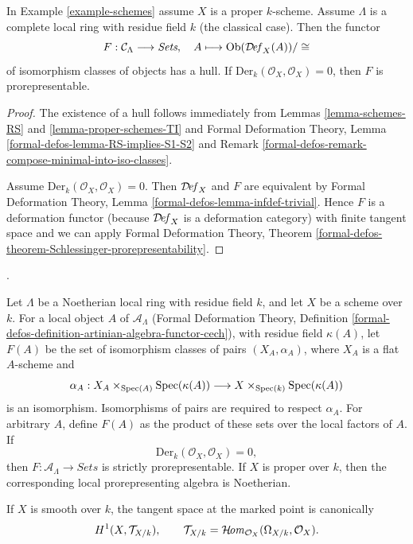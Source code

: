 \begin{lemma}
\label{lemma-schemes-hull}
In Example \ref{example-schemes} assume $X$ is a proper $k$-scheme.
Assume $\Lambda$ is a complete local ring with residue field $k$
(the classical case). Then the functor
$$
F : \mathcal{C}_\Lambda \longrightarrow \textit{Sets},\quad
A \longmapsto \mathop{\mathrm{Ob}}\nolimits(\mathcal{D}\!\mathit{ef}_X(A))/\cong
$$
of isomorphism classes of objects has a hull. If
$\text{Der}_k(\mathcal{O}_X, \mathcal{O}_X) = 0$, then
$F$ is prorepresentable.
\end{lemma}

\begin{proof}
The existence of a hull follows immediately from
Lemmas \ref{lemma-schemes-RS} and \ref{lemma-proper-schemes-TI} and
Formal Deformation Theory, Lemma \ref{formal-defos-lemma-RS-implies-S1-S2}
and Remark \ref{formal-defos-remark-compose-minimal-into-iso-classes}.

\medskip\noindent
Assume $\text{Der}_k(\mathcal{O}_X, \mathcal{O}_X) = 0$. Then
$\mathcal{D}\!\mathit{ef}_X$ and $F$ are equivalent by
Formal Deformation Theory, Lemma \ref{formal-defos-lemma-infdef-trivial}.
Hence $F$ is a deformation functor (because $\mathcal{D}\!\mathit{ef}_X$ is a
deformation category) with finite tangent space and we can apply
Formal Deformation Theory, Theorem
\ref{formal-defos-theorem-Schlessinger-prorepresentability}.
\end{proof}

\begin{lemma}
\label{lemma-schemes-formal-moduli-no-infinitesimal-automorphisms}
\begin{reference}
\cite[Expos\'e 195, C, Proposition 4.1, pp. 385--386]{FGA}.
\end{reference}
Let $\Lambda$ be a Noetherian local ring with residue field $k$, and let
$X$ be a scheme over $k$. For a local object $A$ of
$\mathcal{A}_\Lambda$ (Formal Deformation Theory, Definition
\ref{formal-defos-definition-artinian-algebra-functor-cech}), with residue
field $\kappa(A)$, let $F(A)$ be the set of isomorphism classes of pairs
$(X_A, \alpha_A)$, where $X_A$ is a flat $A$-scheme and
$$
\alpha_A : X_A \times_{\mathop{\mathrm{Spec}}(A)} \mathop{\mathrm{Spec}}(\kappa(A))
\longrightarrow X \times_{\mathop{\mathrm{Spec}}(k)} \mathop{\mathrm{Spec}}(\kappa(A))
$$
is an isomorphism. Isomorphisms of pairs are required to respect $\alpha_A$.
For arbitrary $A$, define $F(A)$ as the product of these sets over the local
factors of $A$. If
$$
\text{Der}_k(\mathcal{O}_X, \mathcal{O}_X) = 0,
$$
then $F : \mathcal{A}_\Lambda \to \textit{Sets}$ is strictly
prorepresentable. If $X$ is proper over $k$, then the corresponding local
prorepresenting algebra is Noetherian.

If $X$ is smooth over $k$, the tangent space at the marked point is
canonically
$$
H^1(X, \mathcal{T}_{X/k}), \qquad
\mathcal{T}_{X/k} =
\mathop{\mathcal{H}\!\mathit{om}}\nolimits_{\mathcal{O}_X}(\Omega_{X/k}, \mathcal{O}_X).
$$
\end{lemma}

